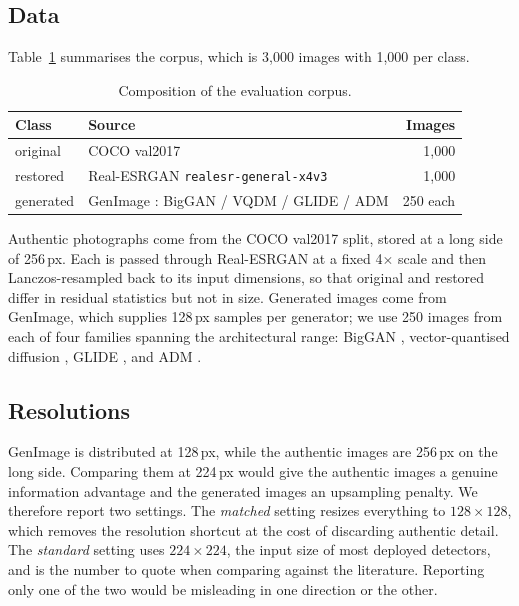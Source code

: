 \documentclass[runningheads]{llncs}
\begin{document}
\subsection{Data}

Table~\ref{tab:data} summarises the corpus, which is 3{,}000 images with 1{,}000 per
class.

\begin{table}[t]
\centering
\caption{Composition of the evaluation corpus.}
\label{tab:data}
\begin{tabular}{@{}llr@{}}
\toprule
Class & Source & Images \\
\midrule
original  & COCO val2017 \cite{lin2014coco} & 1{,}000 \\
restored  & Real-ESRGAN \texttt{realesr-general-x4v3} \cite{wang2021realesrgan} & 1{,}000 \\
generated & GenImage \cite{zhu2023genimage}: BigGAN / VQDM / GLIDE / ADM & 250 each \\
\bottomrule
\end{tabular}
\end{table}

Authentic photographs come from the COCO val2017 split, stored at a long side of
256\,px. Each is passed through Real-ESRGAN at a fixed 4$\times$ scale and then
Lanczos-resampled back to its input dimensions, so that original and restored differ
in residual statistics but not in size. Generated images come from GenImage, which
supplies 128\,px samples per generator; we use 250 images from each of four families
spanning the architectural range: BigGAN \cite{brock2019biggan}, vector-quantised
diffusion \cite{gu2022vqdiffusion}, GLIDE \cite{nichol2022glide}, and ADM
\cite{dhariwal2021adm}.

\subsection{Resolutions}

GenImage is distributed at 128\,px, while the authentic images are 256\,px on the
long side. Comparing them at 224\,px would give the authentic images a genuine
information advantage and the generated images an upsampling penalty. We therefore
report two settings. The \emph{matched} setting resizes everything to
$128\times128$, which removes the resolution shortcut at the cost of discarding
authentic detail. The \emph{standard} setting uses $224\times224$, the input size of
most deployed detectors, and is the number to quote when comparing against the
literature. Reporting only one of the two would be misleading in one direction or
the other.
\end{document}
